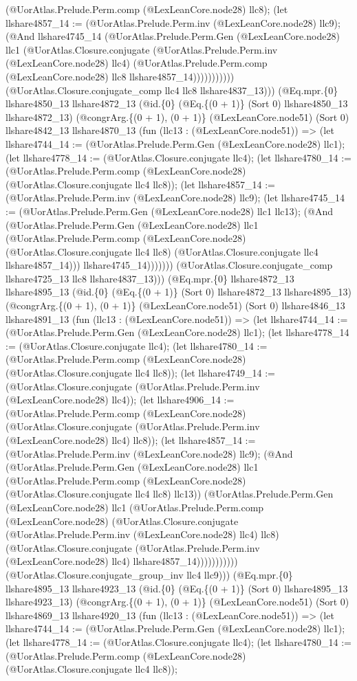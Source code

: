 \documentclass[11pt]{article}
\begin{document}
(@UorAtlas.Prelude.Perm.comp (@LexLeanCore.node28) llc8); (let llshare4857\_14 := (@UorAtlas.Prelude.Perm.inv (@LexLeanCore.node28) llc9); (@And llshare4745\_14 (@UorAtlas.Prelude.Perm.Gen (@LexLeanCore.node28) llc1 (@UorAtlas.Closure.conjugate (@UorAtlas.Prelude.Perm.inv (@LexLeanCore.node28) llc4) (@UorAtlas.Prelude.Perm.comp (@LexLeanCore.node28) llc8 llshare4857\_14))))))))))) (@UorAtlas.Closure.conjugate\_comp llc4 llc8 llshare4837\_13))) (@Eq.mpr.\{0\} llshare4850\_13 llshare4872\_13 (@id.\{0\} (@Eq.\{(0 + 1)\} (Sort 0) llshare4850\_13 llshare4872\_13) (@congrArg.\{(0 + 1), (0 + 1)\} (@LexLeanCore.node51) (Sort 0) llshare4842\_13 llshare4870\_13 (fun (llc13 : (@LexLeanCore.node51)) => (let llshare4744\_14 := (@UorAtlas.Prelude.Perm.Gen (@LexLeanCore.node28) llc1); (let llshare4778\_14 := (@UorAtlas.Closure.conjugate llc4); (let llshare4780\_14 := (@UorAtlas.Prelude.Perm.comp (@LexLeanCore.node28) (@UorAtlas.Closure.conjugate llc4 llc8)); (let llshare4857\_14 := (@UorAtlas.Prelude.Perm.inv (@LexLeanCore.node28) llc9); (let llshare4745\_14 := (@UorAtlas.Prelude.Perm.Gen (@LexLeanCore.node28) llc1 llc13); (@And (@UorAtlas.Prelude.Perm.Gen (@LexLeanCore.node28) llc1 (@UorAtlas.Prelude.Perm.comp (@LexLeanCore.node28) (@UorAtlas.Closure.conjugate llc4 llc8) (@UorAtlas.Closure.conjugate llc4 llshare4857\_14))) llshare4745\_14))))))) (@UorAtlas.Closure.conjugate\_comp llshare4725\_13 llc8 llshare4837\_13))) (@Eq.mpr.\{0\} llshare4872\_13 llshare4895\_13 (@id.\{0\} (@Eq.\{(0 + 1)\} (Sort 0) llshare4872\_13 llshare4895\_13) (@congrArg.\{(0 + 1), (0 + 1)\} (@LexLeanCore.node51) (Sort 0) llshare4846\_13 llshare4891\_13 (fun (llc13 : (@LexLeanCore.node51)) => (let llshare4744\_14 := (@UorAtlas.Prelude.Perm.Gen (@LexLeanCore.node28) llc1); (let llshare4778\_14 := (@UorAtlas.Closure.conjugate llc4); (let llshare4780\_14 := (@UorAtlas.Prelude.Perm.comp (@LexLeanCore.node28) (@UorAtlas.Closure.conjugate llc4 llc8)); (let llshare4749\_14 := (@UorAtlas.Closure.conjugate (@UorAtlas.Prelude.Perm.inv (@LexLeanCore.node28) llc4)); (let llshare4906\_14 := (@UorAtlas.Prelude.Perm.comp (@LexLeanCore.node28) (@UorAtlas.Closure.conjugate (@UorAtlas.Prelude.Perm.inv (@LexLeanCore.node28) llc4) llc8)); (let llshare4857\_14 := (@UorAtlas.Prelude.Perm.inv (@LexLeanCore.node28) llc9); (@And (@UorAtlas.Prelude.Perm.Gen (@LexLeanCore.node28) llc1 (@UorAtlas.Prelude.Perm.comp (@LexLeanCore.node28) (@UorAtlas.Closure.conjugate llc4 llc8) llc13)) (@UorAtlas.Prelude.Perm.Gen (@LexLeanCore.node28) llc1 (@UorAtlas.Prelude.Perm.comp (@LexLeanCore.node28) (@UorAtlas.Closure.conjugate (@UorAtlas.Prelude.Perm.inv (@LexLeanCore.node28) llc4) llc8) (@UorAtlas.Closure.conjugate (@UorAtlas.Prelude.Perm.inv (@LexLeanCore.node28) llc4) llshare4857\_14))))))))))) (@UorAtlas.Closure.conjugate\_group\_inv llc4 llc9))) (@Eq.mpr.\{0\} llshare4895\_13 llshare4923\_13 (@id.\{0\} (@Eq.\{(0 + 1)\} (Sort 0) llshare4895\_13 llshare4923\_13) (@congrArg.\{(0 + 1), (0 + 1)\} (@LexLeanCore.node51) (Sort 0) llshare4869\_13 llshare4920\_13 (fun (llc13 : (@LexLeanCore.node51)) => (let llshare4744\_14 := (@UorAtlas.Prelude.Perm.Gen (@LexLeanCore.node28) llc1); (let llshare4778\_14 := (@UorAtlas.Closure.conjugate llc4); (let llshare4780\_14 := (@UorAtlas.Prelude.Perm.comp (@LexLeanCore.node28) (@UorAtlas.Closure.conjugate llc4 llc8)); 
\end{document}
